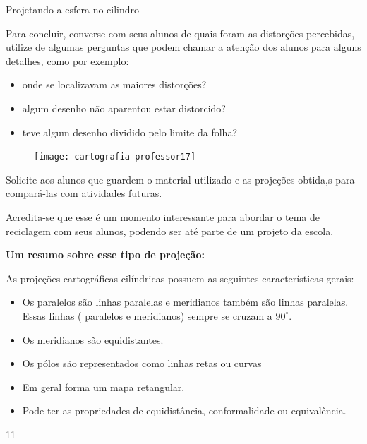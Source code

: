 \clearmargin
\begin{sugestions}{Projetando a esfera no cilindro}
{
  Para concluir, converse com seus alunos de quais foram as distorções percebidas, utilize de algumas perguntas que podem chamar a atenção dos alunos para alguns detalhes, como por exemplo:
  \begin{itemize}
  \item onde se localizavam as maiores distorções?
  \item algum desenho não aparentou estar distorcido?
  \item teve algum desenho dividido pelo limite da folha?
  \end{itemize}

  \begin{figure}[H]
  \centering
  
  \texttt{[image: cartografia-professor17]}
  \end{figure}

  Solicite aos alunos que guardem o material utilizado e as projeções obtida,s para compará-las com atividades futuras.

  Acredita-se que esse é um momento interessante para abordar o tema de reciclagem com seus alunos, podendo ser até parte de um projeto da escola.

\textbf{  Um resumo sobre esse tipo de projeção:}

  As projeções cartográficas cilíndricas possuem as seguintes características gerais:
  \begin{itemize}
  \item Os paralelos são linhas paralelas e meridianos também são linhas paralelas. Essas linhas ( paralelos e meridianos) sempre se cruzam a $90^{\circ}$.
  \item Os meridianos são equidistantes.
  \item Os pólos são representados como linhas retas ou curvas 
  \item Em geral forma um mapa retangular.
  \item Pode ter as propriedades de equidistância, conformalidade ou equivalência.
  \end{itemize}
  }{1}{1}
\end{sugestions}

\label{Pcilindricas}

